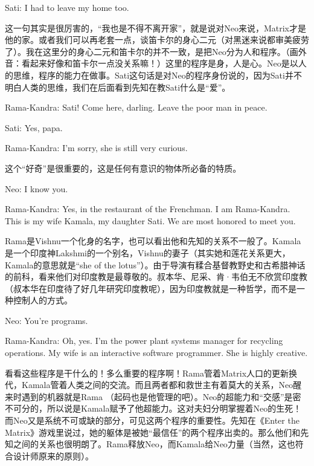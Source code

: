 \documentclass[UTF8]{ctexart}
\newenvironment{myquote}{\color{green} \setlength{\leftskip}{6em} \setlength{\rightskip}{4em} \setlength{\parindent}{-2em}}{\par}
\begin{document}
\begin{myquote}
Sati: I had to leave my home too.
\end{myquote}

这一句其实是很厉害的，“我也是不得不离开家”，就是说对Neo来说，Matrix才是他的家。或者我们可以再老套一点，谈笛卡尔的身心二元（对黑迷来说都审美疲劳了）。我在这里分的身心二元和笛卡尔的并不一致，是把Neo分为人和程序。（画外音：看起来好像和笛卡尔一点没关系嘛！）这里的程序是身，人是心。Neo是以人的思维，程序的能力在做事。Sati这句话是对Neo的程序身份说的，因为Sati并不明白人类的思维，我们在后面看到先知在教Sati什么是“爱”。

\begin{myquote}
Rama-Kandra: Sati! Come here, darling. Leave the poor man in peace.

Sati: Yes, papa.

Rama-Kandra: I'm sorry, she is still very curious.
\end{myquote}

这个“好奇”是很重要的，这是任何有意识的物体所必备的特质。

\begin{myquote}
Neo: I know you.

Rama-Kandra: Yes, in the restaurant of the Frenchman. I am Rama-Kandra. This is my wife Kamala, my daughter Sati. We are most honored to meet you.
\end{myquote}

Rama是Vishnu一个化身的名字，也可以看出他和先知的关系不一般了。Kamala是一个印度神Lakshmi的一个别名，Vishnu的妻子（其实她和莲花关系更大，Kamala的意思就是“she of the lotus”）。由于导演有糅合基督教野史和古希腊神话的前科，看来他们对印度教是最尊敬的。叔本华、尼采、肯·韦伯无不欣赏印度教（叔本华在印度待了好几年研究印度教呢），因为印度教就是一种哲学，而不是一种控制人的方式。

\begin{myquote}
Neo: You're programs.

Rama-Kandra: Oh, yes. I'm the power plant systems manager for recycling operations. My wife is an interactive software programmer. She is highly creative.
\end{myquote}

看看这些程序是干什么的！多么重要的程序啊！Rama管着Matrix人口的更新换代，Kamala管着人类之间的交流。而且两者都和救世主有着莫大的关系，Neo醒来时遇到的机器就是Rama （起码也是他管理的吧）。Neo的超能力和“交感”是密不可分的，所以说是Kamala赋予了他超能力。这对夫妇分明掌握着Neo的生死！而Neo又是系统不可或缺的部分，可见这两个程序的重要性。先知在《Enter the Matrix》游戏里说过，她的躯体是被她“最信任”的两个程序出卖的。那么他们和先知之间的关系也很明朗了。Rama释放Neo，而Kamala给Neo力量（当然，这也符合设计师原来的原则）。
\end{document}
